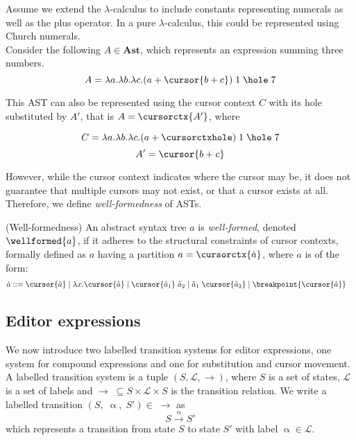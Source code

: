\begin{exmp}
   Assume we extend the $\lambda$-calculus to include constants representing numerals as well as the plus operator. In a pure $\lambda$-calculus, this could be represented using Church numerals.\\
    
    Consider the following $A \in \mathbf{Ast}$, which represents an expression summing three numbers.
    \begin{equation*}
        A = \lambda a.\lambda b. \lambda c.(a+\cursor{b+c})\; 1\; \hole\; 7
    \end{equation*}
    
    This AST can also be represented using the cursor context $C$ with its hole substituted by $A'$, that is $A = \cursorctx{A'}$, where
    
    \begin{equation*}
        C = \lambda a.\lambda b. \lambda c.(a+\cursorctxhole)\; 1\; \hole\; 7
    \end{equation*}
    \begin{equation*}
        A' = \cursor{b+c}
    \end{equation*}
\end{exmp}

However, while the cursor context indicates where the cursor may be, it does not guarantee that multiple cursors may not exist, or that a cursor exists at all. Therefore, we define \textit{well-formedness} of ASTs.

\theoremstyle{definition}
\begin{definition}{(Well-formedness)}
An abstract syntax tree $a$ is \textit{well-formed}, denoted $\wellformed{a}$, if it adheres to the structural constraints of cursor contexts, formally defined as $a$ having a partition $a = \cursorctx{\dot{a}}$, where $\dot{a}$ is of the form:
\begin{align*}
    \dot{a} ::=\;& \cursor{\hat{a}} \mid \lambda x.\cursor{\hat{a}} \mid \cursor{\hat{a}_1}\; \hat{a}_2 \mid \hat{a}_1\; \cursor{\hat{a}_2} \mid \breakpoint{\cursor{\hat{a}}}
\end{align*}
\end{definition}

\subsection*{Editor expressions}
We now introduce two labelled transition systems for editor expressions, one system for compound expressions and one for substitution and cursor movement. A labelled transition system is a tuple $(S, \mathcal{L}, \rightarrow)$, where $S$ is a set of states, $\mathcal{L}$ is a set of labels and $\rightarrow\; \subseteq S \times \mathcal{L} \times S$ is the transition relation. We write a labelled transition $(S,\; \upalpha,\; S') \in\; \rightarrow$ as
\begin{equation*}
    S \xrightarrow{\upalpha} S'
\end{equation*}
which represents a transition from state $S$ to state $S'$ with label $\upalpha \in \mathcal{L}$. \\

